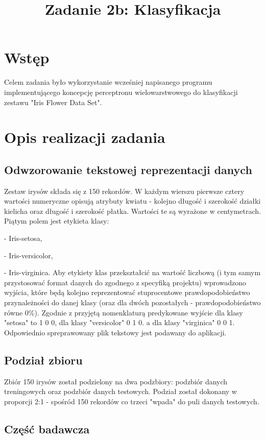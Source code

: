 \documentclass{classrep}
\author{
  \studentinfo{Marcin Pajkowski}{211968} \and
  \studentinfo{Rafał Warda}{214067}
}
\title{Zadanie 2b: Klasyfikacja}
\begin{document}
\maketitle

\section{Wstęp}
Celem zadania było wykorzystanie wcześniej napisanego programu implementującego koncepcję perceptronu wielowarstwowego do klasyfikacji zestawu "Iris Flower Data Set".

\section{Opis realizacji zadania}
\subsection{Odwzorowanie tekstowej reprezentacji danych}
Zestaw irysów składa się z 150 rekordów. W każdym wierszu pierwsze cztery wartości numeryczne opisują atrybuty kwiatu - kolejno długość i szerokość działki kielicha oraz długość i szerokość płatka. Wartości te są wyrażone w centymetrach. Piątym polem jest etykieta klasy:

- Iris-setosa,

- Iris-versicolor,

- Iris-virginica.
\newline
Aby etykiety klas przekształcić na wartość liczbową (i tym samym przystosować format danych do zgodnego z specyfiką projektu) wprowadzono wyjścia, które będą kolejno reprezentować stuprocentowe prawdopodobieństwo przynależności do danej klasy (oraz dla dwóch pozostałych - prawdopodobieństwo równe 0\%). Zgodnie z przyjętą nomenklaturą predykowane wyjście dla klasy "setosa" to 1 0 0, dla klasy "versicolor" 0 1 0. a dla klasy "virginica" 0 0 1. Odpowiednio spreprawowany plik tekstowy jest podawany do aplikacji.
\subsection{Podział zbioru}
Zbiór 150 irysów został podzielony na dwa podzbiory: podzbiór danych treningowych oraz podzbiór danych testowych. Podział został dokonany w proporcji 2:1 - spośród 150 rekordów co trzeci "wpada" do puli danych testowych.
\subsection{Część badawcza}
\end{document}
